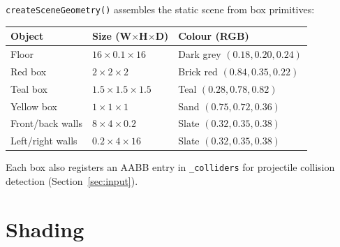 \documentclass[a4paper, 12pt]{article}
\begin{document}

\texttt{createSceneGeometry()} assembles the static scene from box primitives:

\begin{center}
\begin{tabular}{lll}
\toprule
\textbf{Object} & \textbf{Size (W$\times$H$\times$D)} & \textbf{Colour (RGB)} \\
\midrule
Floor            & $16\times0.1\times16$ & Dark grey $(0.18,0.20,0.24)$ \\
Red box          & $2\times2\times2$     & Brick red $(0.84,0.35,0.22)$ \\
Teal box         & $1.5\times1.5\times1.5$ & Teal $(0.28,0.78,0.82)$ \\
Yellow box       & $1\times1\times1$     & Sand $(0.75,0.72,0.36)$ \\
Front/back walls & $8\times4\times0.2$   & Slate $(0.32,0.35,0.38)$ \\
Left/right walls & $0.2\times4\times16$  & Slate $(0.32,0.35,0.38)$ \\
\bottomrule
\end{tabular}
\end{center}

Each box also registers an AABB entry in \texttt{\_colliders} for projectile
collision detection (Section~\ref{sec:input}).



\section{Shading}
\end{document}
